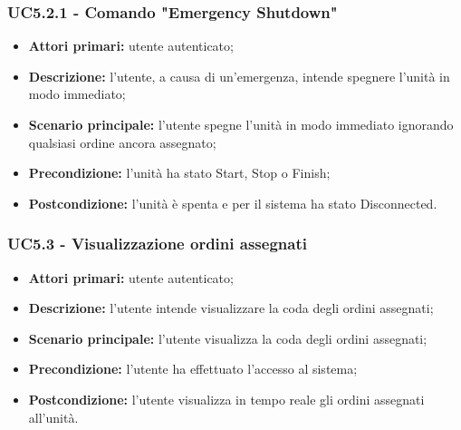 \subsubsection{UC5.2.1 - Comando "Emergency Shutdown"}
\begin{itemize}
    \item \textbf{Attori primari:} utente autenticato;
    \item \textbf{Descrizione:} l'utente, a causa di un'emergenza, intende spegnere l'unità in modo immediato;
    \item \textbf{Scenario principale:} l'utente spegne l'unità in modo immediato ignorando qualsiasi ordine ancora assegnato;
    \item \textbf{Precondizione:} l'unità ha stato Start, Stop o Finish;
    \item \textbf{Postcondizione:} l'unità è spenta e per il sistema ha stato Disconnected.
\end{itemize}

\subsubsection{UC5.3 - Visualizzazione ordini assegnati}
\begin{itemize}
    \item \textbf{Attori primari:} utente autenticato;
    \item \textbf{Descrizione:} l'utente intende visualizzare la coda degli ordini assegnati;
    \item \textbf{Scenario principale:} l'utente visualizza la coda degli ordini assegnati;
    \item \textbf{Precondizione:} l'utente ha effettuato l'accesso al sistema;
    \item \textbf{Postcondizione:} l'utente visualizza in tempo reale gli ordini assegnati all'unità.
\end{itemize}

